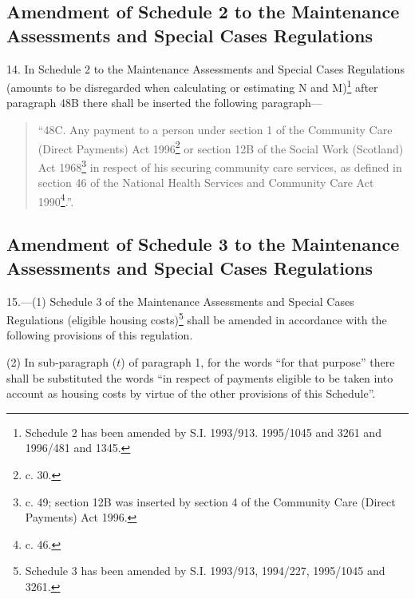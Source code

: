 \documentclass[12pt,a4paper]{article}
\begin{document}
\subsection[14. Amendment of Schedule 2 to the Maintenance Assessments and Special Cases Regulations]{Amendment of Schedule 2 to the Maintenance Assessments and Special Cases Regulations}

14.  In Schedule 2 to the Maintenance Assessments and Special Cases Regulations (amounts to be disregarded when calculating or estimating N and M)\footnote{\frenchspacing Schedule 2 has been amended by S.I. 1993/913. 1995/1045 and 3261 and 1996/481 and 1345.} after paragraph 48B there shall be inserted the following paragraph—
\begin{quotation}
“48C.  Any payment to a person under section 1 of the Community Care (Direct Payments) Act 1996\footnote{ c. 30.} or section 12B of the Social Work (Scotland) Act 1968\footnote{ c. 49; section 12B was inserted by section 4 of the Community Care (Direct Payments) Act 1996.} in respect of his securing community care services, as defined in section 46 of the National Health Services and Community Care Act 1990\footnote{ c. 46.}.”.
\end{quotation}

\subsection[15. Amendment of Schedule 3 to the Maintenance Assessments and Special Cases Regulations]{Amendment of Schedule 3 to the Maintenance Assessments and Special Cases Regulations}

15.—(1) Schedule 3 of the Maintenance Assessments and Special Cases Regulations (eligible housing costs)\footnote{\frenchspacing Schedule 3 has been amended by S.I. 1993/913, 1994/227, 1995/1045 and 3261.} shall be amended in accordance with the following provisions of this regulation.

(2) In sub-paragraph ($t$) of paragraph 1, for the words “for that purpose” there shall be substituted the words “in respect of payments eligible to be taken into account as housing costs by virtue of the other provisions of this Schedule”.
\end{document}
